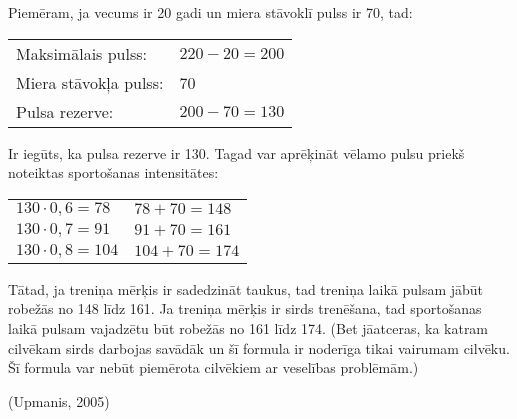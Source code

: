\documentclass[12pt]{article}
\begin{document}
Piemēram, ja vecums ir 20 gadi un miera stāvoklī pulss ir 70, tad:\par
\vspace{4pt}
\begin{tabular}{l|l}
    Maksimālais pulss: & $220-20=200$ \\
    Miera stāvokļa pulss: & 70\\
    Pulsa rezerve: & $200-70=130$\\
\end{tabular}\par
\vspace{4pt}
Ir iegūts, ka pulsa rezerve ir 130. Tagad var aprēķināt vēlamo pulsu priekš noteiktas sportošanas intensitātes:\par
\vspace{4pt}
\begin{tabular}{l|l}
    $130\cdot 0,6=78$ & $78+70=148$ \\
    $130\cdot 0,7=91$ & $91+70=161$ \\
    $130\cdot 0,8=104$ & $104+70=174$
\end{tabular}\par
\vspace{4pt}
Tātad, ja treniņa mērķis ir sadedzināt taukus, tad treniņa laikā pulsam jābūt robežās no 148 līdz 161. Ja treniņa mērķis ir sirds trenēšana, tad sportošanas laikā pulsam vajadzētu būt robežās no 161 līdz 174. (Bet jāatceras, ka katram cilvēkam sirds darbojas savādāk un šī formula ir noderīga tikai vairumam cilvēku. Šī formula var nebūt piemērota cilvēkiem ar veselības problēmām.)\par
(Upmanis, 2005)
\end{document}
